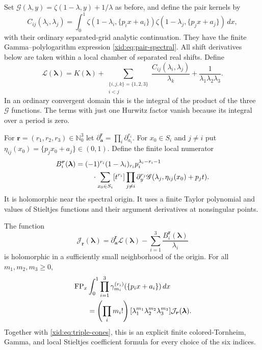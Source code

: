 Set $\mathscr G(\lambda,y)=\zeta(1-\lambda,y)+1/\lambda$ as before,
and define the pair kernels by
\[
 C_{ij}(\lambda_i,\lambda_j)
 =\int_0^1\zeta(1-\lambda_i,\{p_ix+a_i\})
                \zeta(1-\lambda_j,\{p_jx+a_j\})\,dx,
\]
with their ordinary separated-grid analytic continuation.
They have the finite Gamma--polylogarithm expression
\eqref{xid:eq:pair-spectral}. All shift derivatives below are taken within
a local chamber of separated real shifts. Define
\begin{equation}\label{xid:eq:triple-regular-spectral}
 \mathcal L(\boldsymbol\lambda)
 =K(\boldsymbol\lambda)+\sum_{\substack{\{i,j,k\}=\{1,2,3\}\\i<j}}
       \frac{C_{ij}(\lambda_i,\lambda_j)}{\lambda_k}
       +\frac1{\lambda_1\lambda_2\lambda_3}.
\end{equation}
In an ordinary convergent domain this is the integral of the product
of the three $\mathscr G$ functions.  The terms with just one Hurwitz
factor vanish because its integral over a period is zero.

For $\boldsymbol r=(r_1,r_2,r_3)\in\mathbb N_0^3$ let
$\partial_{\boldsymbol a}^{\boldsymbol r}=\prod_i\partial_{a_i}^{r_i}$.
For $x_0\in S_i$ and $j\ne i$ put
$\eta_{ij}(x_0)=\{p_jx_0+a_j\}\in(0,1)$.  Define the finite local
numerator
\begin{align}
 B_i^{\boldsymbol r}(\boldsymbol\lambda)
 ={}&(-1)^{r_i}(1-\lambda_i)_{r_i}
          p_i^{\lambda_i-r_i-1}\notag\\
 &\quad\cdot\sum_{x_0\in S_i}[t^{r_i}]
   \prod_{j\ne i}\partial_y^{r_j}
          \mathscr G(\lambda_j,\eta_{ij}(x_0)+p_jt).
 \label{xid:eq:triple-local-B}
\end{align}
It is holomorphic near the spectral origin.  It uses a finite Taylor
polynomial and values of Stieltjes functions and their argument
derivatives at nonsingular points.

\begin{theorem}
\label{xid:thm:triple-FP}
The function
\begin{equation}\label{xid:eq:triple-holomorphic-J}
 \mathcal J_{\boldsymbol r}(\boldsymbol\lambda)
 =\partial_{\boldsymbol a}^{\boldsymbol r}
       \mathcal L(\boldsymbol\lambda)
       -\sum_{i=1}^3\frac{B_i^{\boldsymbol r}(\boldsymbol\lambda)}{\lambda_i}
\end{equation}
is holomorphic in a sufficiently small neighborhood of the origin.
For all $m_1,m_2,m_3\ge0$,
\begin{align}
 &\operatorname{FP}_x\int_0^1\prod_{i=1}^3
       \gamma_{m_i}^{(r_i)}(\{p_ix+a_i\})\,dx\notag\\
 &\qquad=\left(\prod_i m_i!\right)
       [\lambda_1^{m_1}\lambda_2^{m_2}\lambda_3^{m_3}]
          \mathcal J_{\boldsymbol r}(\boldsymbol\lambda).
 \label{xid:eq:triple-FP-value}
\end{align}
Together with \eqref{xid:eq:triple-cones}, this is an explicit finite
colored-Tornheim, Gamma, and local Stieltjes coefficient formula for
every choice of the six indices.
\end{theorem}

